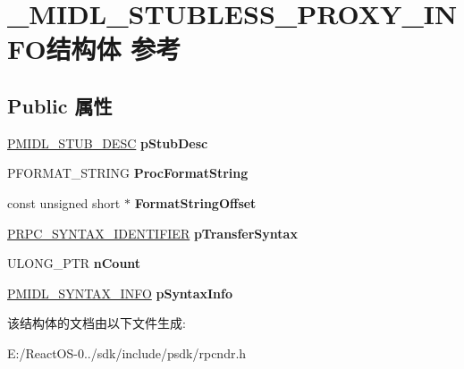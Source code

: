 \hypertarget{struct___m_i_d_l___s_t_u_b_l_e_s_s___p_r_o_x_y___i_n_f_o}{}\section{\+\_\+\+M\+I\+D\+L\+\_\+\+S\+T\+U\+B\+L\+E\+S\+S\+\_\+\+P\+R\+O\+X\+Y\+\_\+\+I\+N\+F\+O结构体 参考}
\label{struct___m_i_d_l___s_t_u_b_l_e_s_s___p_r_o_x_y___i_n_f_o}
\subsection*{Public 属性}
\begin{DoxyCompactItemize}
\item 
\mbox{\label{struct___m_i_d_l___s_t_u_b_l_e_s_s___p_r_o_x_y___i_n_f_o_aa78f3fc7ee0b58854117c179c68a5394}} 
\hyperlink{struct___m_i_d_l___s_t_u_b___d_e_s_c}{P\+M\+I\+D\+L\+\_\+\+S\+T\+U\+B\+\_\+\+D\+E\+SC} {\bfseries p\+Stub\+Desc}
\item 
\mbox{\label{struct___m_i_d_l___s_t_u_b_l_e_s_s___p_r_o_x_y___i_n_f_o_a0b6c84ae2be3be6b4483b0a1bbb7265e}} 
P\+F\+O\+R\+M\+A\+T\+\_\+\+S\+T\+R\+I\+NG {\bfseries Proc\+Format\+String}
\item 
\mbox{\label{struct___m_i_d_l___s_t_u_b_l_e_s_s___p_r_o_x_y___i_n_f_o_a8fe8add437987567c453a7cb544c502d}} 
const unsigned short $\ast$ {\bfseries Format\+String\+Offset}
\item 
\mbox{\label{struct___m_i_d_l___s_t_u_b_l_e_s_s___p_r_o_x_y___i_n_f_o_abf0463b11f13595d3fabf4b34e7a1034}} 
\hyperlink{struct___r_p_c___s_y_n_t_a_x___i_d_e_n_t_i_f_i_e_r}{P\+R\+P\+C\+\_\+\+S\+Y\+N\+T\+A\+X\+\_\+\+I\+D\+E\+N\+T\+I\+F\+I\+ER} {\bfseries p\+Transfer\+Syntax}
\item 
\mbox{\label{struct___m_i_d_l___s_t_u_b_l_e_s_s___p_r_o_x_y___i_n_f_o_a7e4d21f87aeec7e7bdb5d854c8188e0e}} 
U\+L\+O\+N\+G\+\_\+\+P\+TR {\bfseries n\+Count}
\item 
\mbox{\label{struct___m_i_d_l___s_t_u_b_l_e_s_s___p_r_o_x_y___i_n_f_o_a1459b9fd8ddbc76d9e62ac7868805ffa}} 
\hyperlink{struct___m_i_d_l___s_y_n_t_a_x___i_n_f_o}{P\+M\+I\+D\+L\+\_\+\+S\+Y\+N\+T\+A\+X\+\_\+\+I\+N\+FO} {\bfseries p\+Syntax\+Info}
\end{DoxyCompactItemize}


该结构体的文档由以下文件生成\+:\begin{DoxyCompactItemize}
\item 
E\+:/\+React\+O\+S-\/0../sdk/include/psdk/rpcndr.\+h\end{DoxyCompactItemize}
